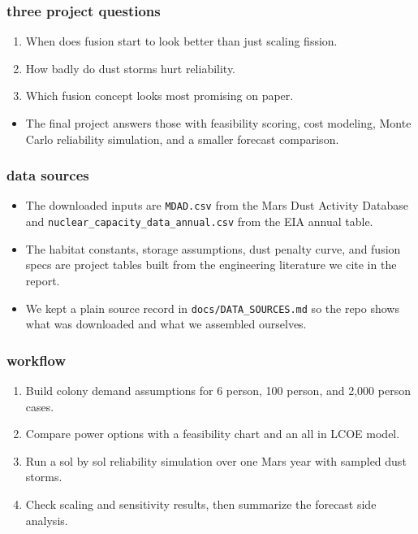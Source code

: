 \documentclass[11pt, xcolor={dvipsnames}, usepdftitle=false]{beamer}
\begin{document}
\begin{frame}
\frametitle{three project questions}
\begin{enumerate}
\item When does fusion start to look better than just scaling fission.
\item How badly do dust storms hurt reliability.
\item Which fusion concept looks most promising on paper.
\end{enumerate}

\vspace{0.3cm}
\begin{itemize}
\item The final project answers those with feasibility scoring, cost modeling, Monte Carlo reliability simulation, and a smaller forecast comparison.
\end{itemize}
\end{frame}

\begin{frame}
\frametitle{data sources}
\begin{itemize}
\item The downloaded inputs are \texttt{MDAD.csv} from the Mars Dust Activity Database and \texttt{nuclear\_capacity\_data\_annual.csv} from the EIA annual table.
\item The habitat constants, storage assumptions, dust penalty curve, and fusion specs are project tables built from the engineering literature we cite in the report.
\item We kept a plain source record in \texttt{docs/DATA\_SOURCES.md} so the repo shows what was downloaded and what we assembled ourselves.
\end{itemize}
\end{frame}

\begin{frame}
\frametitle{workflow}
\begin{enumerate}
\item Build colony demand assumptions for 6 person, 100 person, and 2{,}000 person cases.
\item Compare power options with a feasibility chart and an all in LCOE model.
\item Run a sol by sol reliability simulation over one Mars year with sampled dust storms.
\item Check scaling and sensitivity results, then summarize the forecast side analysis.
\end{enumerate}
\end{frame}
\end{document}
